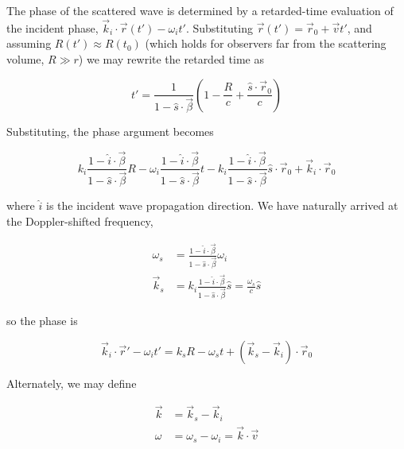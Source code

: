 The phase of the scattered wave is determined by a retarded-time evaluation of the incident phase, $\vec{k}_i \cdot \vec{r}(t') - \omega_i t'$.  Substituting $\vec{r}(t') = \vec{r}_0 + \vec{v}t'$, and assuming $R(t') \approx R(t_0)$ (which holds for observers far from the scattering volume, $R \gg r$) we may rewrite the retarded time as

\begin{equation}
 t' = \frac{1}{1 - \hat{s} \cdot \vec{\beta}} \left( 1 - \frac{R}{c} + \frac{\hat{s} \cdot \vec{r}_0}{c} \right)
\end{equation}

\noindent Substituting, the phase argument becomes

\begin{equation}\label{eq:ts_phase}
 k_i \frac{1 - \hat{i} \cdot \vec{\beta}}{1 - \hat{s} \cdot \vec{\beta}} R - \omega_i \frac{1 - \hat{i} \cdot \vec{\beta}}{1 - \hat{s} \cdot \vec{\beta}} t - k_i \frac{1 - \hat{i} \cdot \vec{\beta}}{1 - \hat{s} \cdot \vec{\beta}} \hat{s} \cdot \vec{r}_0 + \vec{k}_i \cdot \vec{r}_0
\end{equation}

\noindent where $\hat{i}$ is the incident wave propagation direction.  We have naturally arrived at the Doppler-shifted frequency, 

\begin{equation}\label{eq:doppler}
 \begin{aligned}
  \omega_s &= \frac{1 - \hat{i} \cdot \vec{\beta}}{1 - \hat{s} \cdot \vec{\beta}} \omega_i\\
  \vec{k}_s &= k_i \frac{1 - \hat{i} \cdot \vec{\beta}}{1 - \hat{s} \cdot \vec{\beta}} \hat{s} = \frac{\omega_s}{c} \hat{s}
 \end{aligned}
\end{equation}

\noindent so the phase is

\begin{equation}
 \vec{k}_i \cdot \vec{r}' - \omega_i t' = k_s R - \omega_s t + \left( \vec{k}_s - \vec{k}_i \right) \cdot \vec{r}_0
\end{equation}

\noindent Alternately, we may define

\begin{equation}\label{eq:ts_komega}
 \begin{aligned}
  \vec{k} &= \vec{k}_s - \vec{k}_i\\
  \omega &= \omega_s - \omega_i = \vec{k} \cdot \vec{v}
 \end{aligned}
\end{equation}

